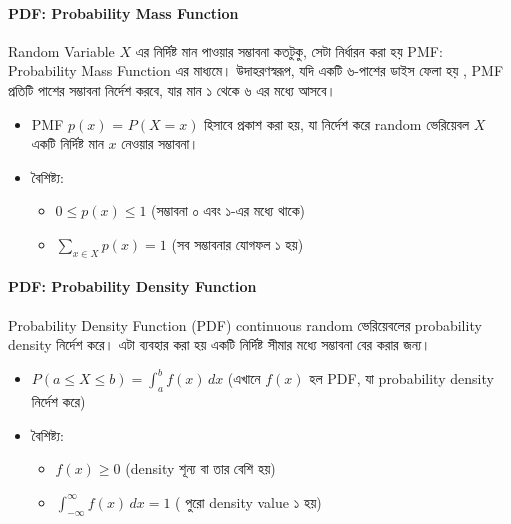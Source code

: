 \documentclass[graybox, envcountchap, twocolumn]{styles/svmult}
\begin{document}
\paragraph{PDF: Probability Mass Function}
{\bengalifont
Random Variable $X$ এর নির্দিষ্ট মান পাওয়ার সম্ভাবনা কতটুকু, সেটা নির্ধারন করা হয় PMF: Probability Mass Function এর মাধ্যমে। উদাহরণস্বরূপ,  যদি একটি ৬-পাশের ডাইস ফেলা হয় , PMF প্রতিটি পাশের সম্ভাবনা নির্দেশ করবে, যার মান ১ থেকে ৬ এর মধ্যে আসবে।
}
\begin{itemize}
    \item PMF $p(x)$ = $P(X=x)$ {\bengalifont হিসাবে প্রকাশ করা হয়, যা নির্দেশ করে random ভেরিয়েবল $X$ একটি নির্দিষ্ট মান $x$ নেওয়ার সম্ভাবনা। }
    \item {\bengalifont বৈশিষ্ট্য:}
    \begin{itemize}
        \item $0 ≤ p(x) ≤ 1$ {\bengalifont (সম্ভাবনা ০ এবং ১-এর মধ্যে থাকে)}
        \item $\sum_{x \in X} p(x) = 1$ {\bengalifont (সব সম্ভাবনার যোগফল ১ হয়)}
    \end{itemize}
\end{itemize}


\paragraph{PDF: Probability Density Function}

{\bengalifont Probability Density Function (PDF) continuous random ভেরিয়েবলের probability density নির্দেশ করে। এটা ব্যবহার করা হয় একটি নির্দিষ্ট সীমার মধ্যে সম্ভাবনা বের করার জন্য। }

\begin{itemize}
    \item $P(a \leq X \leq b) = \int_{a}^{b} f(x) \, dx$ {\bengalifont (এখানে $f(x)$ হল PDF, যা probability density নির্দেশ করে)}
    \item {\bengalifont বৈশিষ্ট্য:}
    \begin{itemize}
        \item $f(x) \geq 0$ {\bengalifont (density  শূন্য বা তার বেশি হয়)}
        \item $\int_{-\infty}^{\infty} f(x) \, dx = 1$ {\bengalifont ( পুরো density value ১ হয়)}
    \end{itemize}
\end{itemize}
\end{document}
